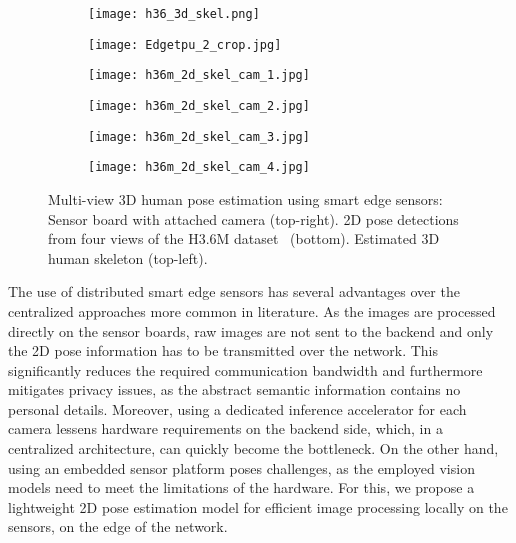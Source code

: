\documentclass[conference]{IEEEtran}
\begin{document}
\begin{figure}[t]
	\centering
	\begin{subfigure}[c]{0.49\linewidth}
		\centering
		\texttt{[image: h36\_3d\_skel.png]}
		\label{fig:teaser1}
	\end{subfigure}
	\begin{subfigure}[c]{0.49\linewidth}
		\centering
		\texttt{[image: Edgetpu\_2\_crop.jpg]}
		\label{fig:teaser2}
	\end{subfigure}
	\begin{subfigure}[c]{0.24\linewidth}
		\centering
		\texttt{[image: h36m\_2d\_skel\_cam\_1.jpg]}
		\label{fig:teaser31}
	\end{subfigure}
	\begin{subfigure}[c]{0.24\linewidth}
		\centering
		\texttt{[image: h36m\_2d\_skel\_cam\_2.jpg]}
		\label{fig:teaser32}
	\end{subfigure}
	\begin{subfigure}[c]{0.24\linewidth}
		\centering
		\texttt{[image: h36m\_2d\_skel\_cam\_3.jpg]}
		\label{fig:teaser33}
	\end{subfigure}
	\begin{subfigure}[c]{0.24\linewidth}
		\centering
		\texttt{[image: h36m\_2d\_skel\_cam\_4.jpg]}
		\label{fig:teaser34}
	\end{subfigure}
	
	\vspace{-0.7em}
	\caption{Multi-view 3D human pose estimation using smart edge sensors: Sensor board with attached camera (top-right). 2D pose detections from four views of the H3.6M data\-set~\cite{h36m} (bottom). Estimated 3D human skeleton (top-left).}
	\label{fig:teaser}
	\vspace{-1.2em}
\end{figure}
The use of distributed smart edge sensors has several advantages over the centralized approaches more common in literature. As the images are processed directly on the sensor boards, raw images are not sent to the backend and only the 2D pose information has to be transmitted over the network. This significantly reduces the required communication bandwidth and furthermore mitigates privacy issues, as the abstract semantic information contains no personal details. Moreover, using a dedicated inference accelerator for each camera lessens hardware requirements on the backend side, which, in a centralized architecture, can quickly become the bottleneck.
On the other hand, using an embedded sensor platform poses challenges, as the employed vision models need to meet the limitations of the hardware. For this, we propose a lightweight 2D pose estimation model for efficient image processing locally on the sensors, on the edge of the network.
\end{document}

